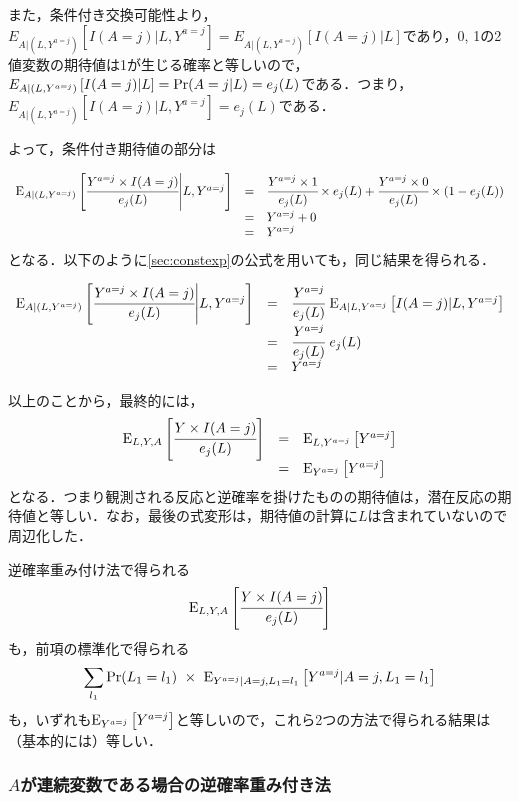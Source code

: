 \documentclass[12pt]{jsarticle}
\begin{document}
また，条件付き交換可能性より，
$E_{A|(L, Y^{a=j})}\left[I(A=j)|L, Y^{a=j}\right]=E_{A|(L, Y^{a=j})}\left[I(A=j)|L\right]$であり，0, 1の2値変数の期待値は1が生じる確率と等しいので，$E_{A|(L, Y^{a=j})}\left[I(A=j)|L\right]={\rm Pr}(A=j|L) = e_j(L)$である．つまり，$E_{A|(L, Y^{a=j})}\left[I(A=j)|L, Y^{a=j}\right]=e_j(L)$である．

よって，条件付き期待値の部分は

\[
\begin{array}{lll}
{\rm E}_{A|(L, Y^{a=j})} \left[ \cfrac{Y^{a=j} \times I(A=j)}{e_j(L)} \middle| L, Y^{a=j} \right] & = &
\cfrac{Y^{a=j} \times 1}{e_j(L)} \times e_j(L) + \cfrac{Y^{a=j} \times 0}{e_j(L)} \times (1-e_j(L)) \\
&=& Y^{a=j} + 0 \\
&=& Y^{a=j}
\end{array}
\]
となる．以下のように\ref{sec:constexp}の公式を用いても，同じ結果を得られる．

\[
\begin{array}{lll}
{\rm E}_{A|(L, Y^{a=j})} \left[ \cfrac{Y^{a=j} \times I(A=j)}{e_j(L)} \middle| L, Y^{a=j} \right] & = &
\cfrac{Y^{a=j}}{e_j(L)} \ {\rm E}_{A|L, Y^{a=j}} \left[I(A=j)|L, Y^{a=j}\right] \\
& = &\cfrac{Y^{a=j}}{e_j(L)} \ e_j(L)\\
&=& Y^{a=j}
\end{array}
\]




以上のことから，最終的には，
\[
\begin{array}{lll}
{\rm E}_{L, Y, A} \left[ \cfrac{Y \times I(A=j)}{e_j(L)} \right]& = & {\rm E}_{L, Y^{a=j}} \left[ Y^{a=j} \right] \\
&=& {\rm E}_{Y^{a=j}} \left[ Y^{a=j} \right]
\end{array}
\]
となる．つまり観測される反応と逆確率を掛けたものの期待値は，潜在反応の期待値と等しい．なお，最後の式変形は，期待値の計算に$L$は含まれていないので周辺化した．

逆確率重み付け法で得られる
\[
{\rm E}_{L, Y, A} \left[ \cfrac{Y \times I(A=j)}{e_j(L)} \right]
\]も，前項の標準化で得られる
\[
\sum_{l_1} {\rm Pr}(L_1 = l_1) \ \times \ {\rm E}_{Y^{a=j}|A=j, L_1=l_1}\left[Y^{a=j}|A=j, L_1=l_1\right] 
\]も，いずれも${\rm E}_{Y^{a=j}} \left[ Y^{a=j} \right]$と等しいので，これら2つの方法で得られる結果は（基本的には）等しい．



\subsubsection{$A$が連続変数である場合の逆確率重み付き法}
\end{document}
